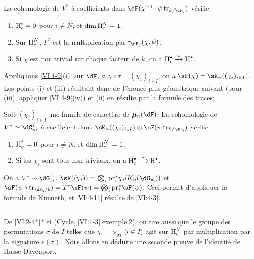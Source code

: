 \begin{proposition_}\label{VI:4-10}
La cohomologie de $V^\ast$ à coefficients dans 
$\sF(\chi^{-1}\cdot \psi\tr_{k/\dF_q})$ vérifie 
\begin{enumerate}[\indent (i)]
  \item $\operatorname{H}_c^i = 0$ pour $i\ne N$, et $\dim \operatorname{H}_c^N=1$. 
  \item Sur $\operatorname{H}_c^N$, $F^\ast$ est la multiplication par 
    $\tau_{\dF_q}(\chi,\psi)$. 
  \item Si $\chi$ est non trivial sur chaque facteur de $k$, on a 
    $\h_c^\bullet \iso \h^\bullet$. 
\end{enumerate}
\end{proposition_}

Appliquons \ref{VI:4-9}(i): sur $\dF$, si $\chi\circ \tau=(\chi_i)_{i\in I}$, 
on a $\sF(\chi) = \sK_n((\chi_i)_{i\in I})$. Les points (i) et (iii) 
résultant donc de l'énoncé plus géométrique suivant (pour (iii), 
appliquer \ref{VI:4-9}(iv)) et (ii) en résulte par la formule des traces: 





\begin{proposition_}\label{VI:4-11}
Soit $(\chi_i)_{i\in I}$ une famille de caractère de $\dmu_n(\dF)$. La 
cohomologie de $V^\ast\simeq \dG_m^I$ à coefficient dans 
$\sK_n((\chi_i)_{i\in I})\otimes \sF(\psi\tr_{k/\dF_q})$ vérifie 
\begin{enumerate}[\indent (i)]
  \item $\operatorname{H}_c^i{}=0$ pour $i\ne N$, et $\dim \operatorname{H}_c^N{} = 1$. 
  \item Si les $\chi_i$ sont tous non triviaux, on a 
    $\h_c^\bullet{}\iso \h^\bullet$. 
\end{enumerate}
\end{proposition_}

On a $V^\ast\sim \dG_m^I$, 
$\sK((\chi_i)) = \bigotimes_i \pr_i^\ast \chi_i(K_n(\dG_m))$ et 
$\sF(\psi\circ \tr_{\dF_q/k})=T^\ast \sF(\psi) = \bigotimes_i \pr_i^\ast \sF(\psi)$. 
Ceci permet d'appliquer la formule de K\"unneth, et \ref{VI:4-11} résulte de 
\ref{VI:4-3}. 





\subsection{}\label{VI:4-12}

De \ref{VI:2-4*}* et (\hyperlink{VI}{Cycle}, \ref{VI:1-3} exemple 2), on tire 
aussi que le groupe des permutations $\sigma$ de $I$ telles que 
$\chi_i = \chi_{\sigma i}$ ($i\in I$) agit sur $\operatorname{H}_c^N$ par multiplication par 
la signature $\varepsilon(\sigma)$. Nous allons en déduire une seconde preuve 
de l'identité de Hasse-Davenport. 

